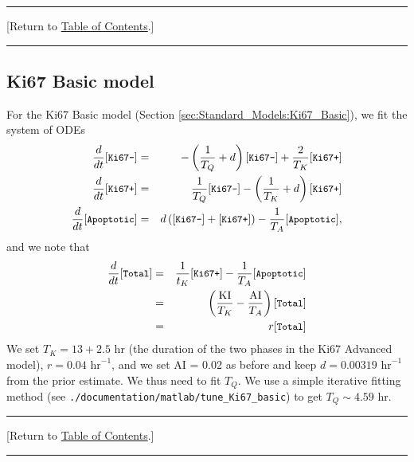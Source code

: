 \documentclass[12pt]{article}
\newcommand{\beqa}{\begin{eqnarray}}
\newcommand{\eeqa}{\end{eqnarray}}
\renewcommand{\v}{\verb}
\renewcommand{\tt}[1]{{\small \left[\texttt{#1}\right] }}
\newcommand{\TOClink}{\begin{center}\hrule\vskip-5pt\phantom{.}\hfill[Return to \hyperlink{TOC}{Table of Contents}.]\hfill\phantom{.}\vskip3pt\hrule\end{center}}
\begin{document}
\TOClink 

\subsection{Ki67 Basic model}
\label{sec:parameters:Ki67_basic}
For the Ki67 Basic model (Section \ref{sec:Standard_Models:Ki67_Basic}), 
we fit the system of ODEs 
\beqa
\frac{d}{dt}\tt{Ki67-} & = & -\left( \frac{1}{T_Q} + d \right) \tt{Ki67-} + \frac{2}{T_K}\tt{Ki67+}  \\
\frac{d}{dt}\tt{Ki67+} & = & \frac{1}{T_Q} \tt{Ki67-} - \left( \frac{1}{T_K} + d \right) \tt{Ki67+} \\
\frac{d}{dt}\tt{Apoptotic} & = & d\left( \tt{Ki67-} + \tt{Ki67+} \right) -\frac{1}{T_A} \tt{Apoptotic}, 
\eeqa
and we note that 
\beqa
\frac{d}{dt}\tt{Total} 
& = & \frac{1}{t_K} \tt{Ki67+} - \frac{1}{T_A} \tt{Apoptotic} \nonumber \\ 
& = & \left( \frac{\textrm{KI}}{T_K} - \frac{\textrm{AI}}{T_A} \right) \tt{Total} \nonumber \\ 
& = & r \tt{Total} 
\eeqa
We set $T_K = 13 + 2.5$ hr (the duration of the two phases in the Ki67 Advanced model), 
$r = 0.04 \textrm{ hr}^{-1}$, and we set AI = 0.02 as before and keep 
$d = 0.00319 \textrm{ hr}^{-1}$ from the prior estimate. We thus need to fit  
$T_Q$. We use a simple iterative fitting method 
(see \v|./documentation/matlab/tune_Ki67_basic|) to get $T_Q \sim 4.59 \textrm{ hr}$. 

\TOClink 
\end{document}
